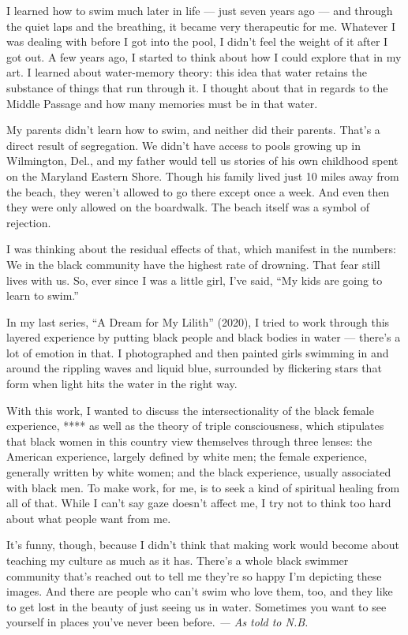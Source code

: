 I learned how to swim much later in life --- just seven years ago ---
and through the quiet laps and the breathing, it became very therapeutic
for me. Whatever I was dealing with before I got into the pool, I didn't
feel the weight of it after I got out. A few years ago, I started to
think about how I could explore that in my art. I learned about
water-memory theory: this idea that water retains the substance of
things that run through it. I thought about that in regards to the
Middle Passage and how many memories must be in that water.

My parents didn't learn how to swim, and neither did their parents.
That's a direct result of segregation. We didn't have access to pools
growing up in Wilmington, Del., and my father would tell us stories of
his own childhood spent on the Maryland Eastern Shore. Though his family
lived just 10 miles away from the beach, they weren't allowed to go
there except once a week. And even then they were only allowed on the
boardwalk. The beach itself was a symbol of rejection.

I was thinking about the residual effects of that, which manifest in the
numbers: We in the black community have the highest rate of drowning.
That fear still lives with us. So, ever since I was a little girl, I've
said, ``My kids are going to learn to swim.''

In my last series, ``A Dream for My Lilith'' (2020), I tried to work
through this layered experience by putting black people and black bodies
in water --- there's a lot of emotion in that. I photographed and then
painted girls swimming in and around the rippling waves and liquid blue,
surrounded by flickering stars that form when light hits the water in
the right way.

With this work, I wanted to discuss the intersectionality of the black
female experience, **** as well as the theory of triple consciousness,
which stipulates that black women in this country view themselves
through three lenses: the American experience, largely defined by white
men; the female experience, generally written by white women; and the
black experience, usually associated with black men. To make work, for
me, is to seek a kind of spiritual healing from all of that. While I
can't say gaze doesn't affect me, I try not to think too hard about what
people want from me.

It's funny, though, because I didn't think that making work would become
about teaching my culture as much as it has. There's a whole black
swimmer community that's reached out to tell me they're so happy I'm
depicting these images. And there are people who can't swim who love
them, too, and they like to get lost in the beauty of just seeing us in
water. Sometimes you want to see yourself in places you've never been
before. \emph{--- As told to N.B.}

